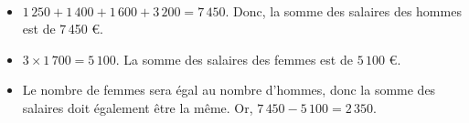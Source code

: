 \ \\ [-5mm]
\begin{itemize}
   \item $1\,250+1\,400+1\,600+3\,200 =7\,450$. Donc, la somme des salaires des hommes est de 7\,450 \euro.
   \item $3\times1\,700 =5\,100$. La somme des salaires des femmes est de $5\,100$ \euro.
   \item Le nombre de femmes sera égal au nombre d'hommes, donc la somme des salaires doit également être la même. Or, $7\,450-5\,100 =2\,350$.
\end{itemize}
    \\

